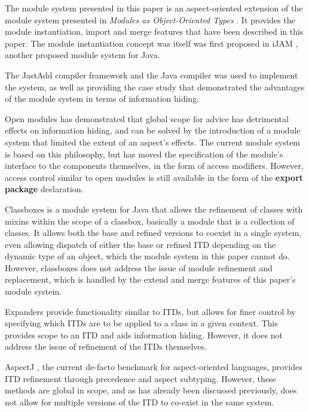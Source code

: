 The module system presented in this paper is an aspect-oriented extension of the module
system presented in \textit{Modules as Object-Oriented Types} \cite{modulesastypes}. It
provides the module instantiation, import and merge features that have been described in
this paper. The module instantiation concept was itself was first proposed in iJAM \cite{iJAM}, 
another proposed module system for Java.

The JastAdd compiler framework and the Java compiler \cite{jastadd, jastaddjavacompiler}
was used to implement the system, as well as providing the case study that demonstrated 
the advantages of the module system in terms of information hiding.

Open modules \cite{openmodules, openmodulesaj} has demonstrated that global scope for advice
has detrimental effects on information hiding, and can be solved by
the introduction of a module system that limited the extent of an aspect's effects. The
current module system is based on this philosophy, but has moved the specification of
the module's interface to the components themselves, in the form of access modifiers.
However, access control similar to open modules is still available in the form of the
\textbf{export package} declaration.

Classboxes \cite{classboxj} is a module system for Java that allows the refinement of classes
with mixins within the scope of a classbox, basically a module that is a collection of classes. 
It allows both the base and refined versions to coexist in a single system, even allowing
dispatch of either the base or refined ITD depending on the dynamic type of an object, which
the module system in this paper cannot do. However, classboxes does not address the issue of
module refinement and replacement, which is handled by the extend and merge features of
this paper's module system.

Expanders \cite{expanders} provide functionality similar to ITDs, but allows for finer control
by specifying which ITDs are to be applied to a class in a given context. This provides scope
to an ITD and aids information hiding. However, it does not address the issue of refinement of 
the ITDs themselves.

AspectJ \cite{overviewaspectj}, the current de-facto benchmark for aspect-oriented languages, 
provides ITD refinement through precedence and aspect subtyping. However, these methods are
global in scope, and as has already been discussed previously, does not allow for multiple
versions of the ITD to co-exist in the same system.

